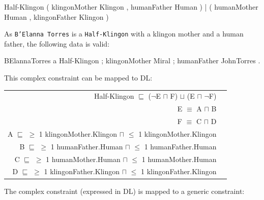\documentclass{llncs}
\newcommand{\ms}[1]{\texttt{#1}}
\newenvironment{DL}{
  \vspace{0cm}
	\begin{center}
  \begin{tabular}{r l}

}{
  \end{tabular}
	\end{center}
}
\begin{document}
\begin{ex}
Half-Klingon { 
    ( klingonMother Klingon , humanFather Human ) |
    ( humanMother Human , klingonFather Klingon ) }
\end{ex}

As \ms{B'Elanna Torres} is a \ms{Half-Klingon} with a klingon mother and a human father, the following data is valid:

\begin{ex}
BElannaTorres a Half-Klingon ;
    klingonMother Miral ; humanFather JohnTorres .
\end{ex}


This complex constraint can be mapped to DL:

\begin{DL}
Half-Klingon $\sqsubseteq$ ($\neg$E $\sqcap$ F) $\sqcup$ (E $\sqcap$ $\neg$F) \\ 
E $\equiv$ A $\sqcap$ B \\
F $\equiv$ C $\sqcap$ D \\
A $\sqsubseteq$ $\geq$ 1 klingonMother.Klingon $\sqcap$ $\leq$ 1 klingonMother.Klingon \\
B $\sqsubseteq$ $\geq$ 1 humanFather.Human $\sqcap$ $\leq$ 1 humanFather.Human \\
C $\sqsubseteq$ $\geq$ 1 humanMother.Human $\sqcap$ $\leq$ 1 humanMother.Human \\
D $\sqsubseteq$ $\geq$ 1 klingonFather.Klingon $\sqcap$ $\leq$ 1 klingonFather.Klingon \\
\end{DL}

The complex constraint (expressed in DL) is mapped to a generic constraint:
\end{document}
